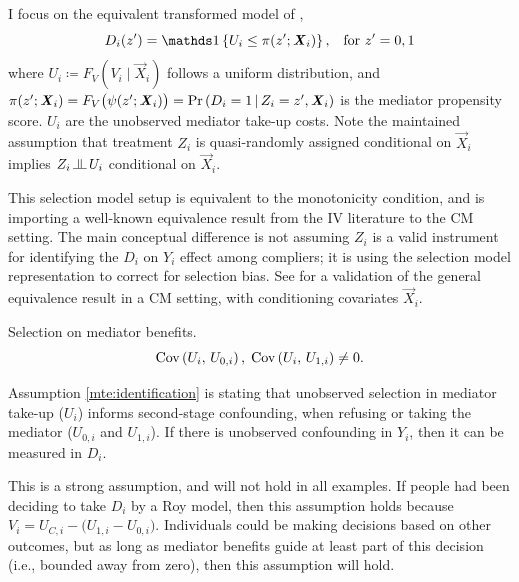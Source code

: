 I focus on the equivalent transformed model of \cite{heckman2005structural},
\[ D_i(z') = \indicator{U_i \leq \pi(z'; \vec X_i)},
    \;\;\; \text{for } z'=0,1 \]
where $U_i \coloneqq F_V\left( V_i \mid \vec X_i \right)$ follows a uniform distribution, and $\pi(z'; \boldsymbol{\mathit{X}}_i) = F_V\big(\psi(z'; \boldsymbol{\mathit{X}}_i)\big) = \Pr\left( D_i = 1 \, \middle\vert \, Z_i = z', \boldsymbol{\mathit{X}}_i \right)$ is the mediator propensity score.
$U_i$ are the unobserved mediator take-up costs.
Note the maintained assumption that treatment $Z_i$ is quasi-randomly assigned conditional on $\vec X_i$ implies $Z_i \indep U_i$ conditional on $\vec X_i$.

This selection model setup is equivalent to the monotonicity condition, and is importing a well-known equivalence result from the IV literature to the CM setting.
The main conceptual difference is not assuming $Z_i$ is a valid instrument for identifying the $D_i$ on $Y_i$ effect among compliers; it is using the selection model representation to correct for selection bias.
See  for a validation of the general \cite{vytlacil2002independence} equivalence result in a CM setting, with conditioning covariates $\vec X_i$.

\begin{assumptionMTE}
    \label{mte:identification}
    Selection on mediator benefits.
    \[ \text{Cov} \left( U_i, \, U_{0,i} \right), \; \text{Cov} \left( U_i, \, U_{1,i} \right) \neq 0. \]
\end{assumptionMTE}
\noindent
Assumption \ref{mte:identification} is stating that unobserved selection in mediator take-up ($U_i$) informs second-stage confounding, when refusing or taking the mediator ($U_{0,i}$ and $U_{1,i}$).
If there is unobserved confounding in $Y_i$, then it can be measured in $D_i$.

This is a strong assumption, and will not hold in all examples.
If people had been deciding to take $D_i$ by a Roy model, then this assumption holds because $V_i = U_{C,i} - \big( U_{1,i} - U_{0,i} \big)$.
Individuals could be making decisions based on other outcomes, but as long as mediator benefits guide at least part of this decision (i.e., bounded away from zero), then this assumption will hold.

